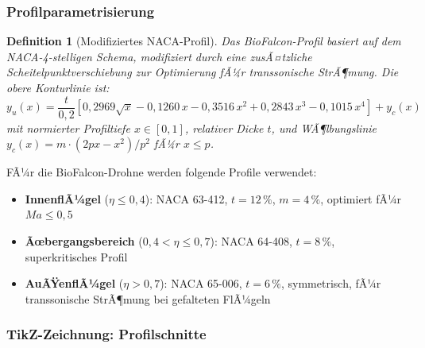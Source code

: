 ﻿\documentclass[12pt,a4paper]{article}
\newtheorem{definition}{Definition}[section]
\theoremstyle{remark}
\begin{document}
	\subsubsection{Profilparametrisierung}
	
	\begin{definition}[Modifiziertes NACA-Profil]
		\label{def:naca}
		Das BioFalcon-Profil basiert auf dem NACA-4-stelligen Schema, modifiziert durch
		eine zusÃ¤tzliche Scheitelpunktverschiebung zur Optimierung fÃ¼r transsonische
		StrÃ¶mung.  Die obere Konturlinie ist:
		\begin{equation}
			y_u(x) = \frac{t}{0{,}2} \left[0{,}2969\sqrt{x}
			- 0{,}1260\,x - 0{,}3516\,x^2 + 0{,}2843\,x^3 - 0{,}1015\,x^4\right]
			+ y_c(x)
			\label{eq:naca_upper}
		\end{equation}
		mit normierter Profiltiefe $x \in [0,1]$, relativer Dicke $t$, und WÃ¶lbungslinie
		$y_c(x) = m \cdot (2px - x^2)/p^2$ fÃ¼r $x \leq p$.
	\end{definition}
	
	FÃ¼r die BioFalcon-Drohne werden folgende Profile verwendet:
	\begin{itemize}
		\item \textbf{InnenflÃ¼gel} ($\eta \leq 0{,}4$): NACA 63-412,
		$t = 12\,\%$, $m = 4\,\%$, optimiert fÃ¼r $Ma \leq 0{,}5$
		\item \textbf{Ãœbergangsbereich} ($0{,}4 < \eta \leq 0{,}7$): NACA 64-408,
		$t = 8\,\%$, superkritisches Profil
		\item \textbf{AuÃŸenflÃ¼gel} ($\eta > 0{,}7$): NACA 65-006, $t = 6\,\%$,
		symmetrisch, fÃ¼r transsonische StrÃ¶mung bei gefalteten FlÃ¼geln
	\end{itemize}
	
	\subsubsection{TikZ-Zeichnung: Profilschnitte}
	
\end{document}

